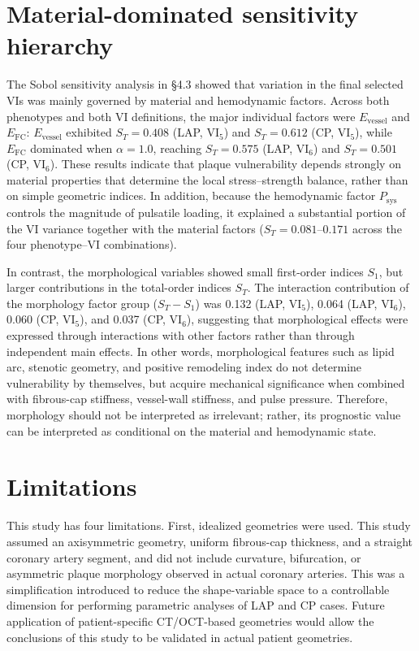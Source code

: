 \documentclass[master,english,final]{kaist-ucs}
\begin{document}
\section{Material-dominated sensitivity hierarchy}
The Sobol sensitivity analysis in \S4.3 showed that variation in the final selected VIs was mainly governed by material and hemodynamic factors. Across both phenotypes and both VI definitions, the major individual factors were $E_\mathrm{vessel}$ and $E_\mathrm{FC}$: $E_\mathrm{vessel}$ exhibited $S_T = 0.408$ (LAP, $\mathrm{VI}_5$) and $S_T = 0.612$ (CP, $\mathrm{VI}_5$), while $E_\mathrm{FC}$ dominated when $\alpha = 1.0$, reaching $S_T = 0.575$ (LAP, $\mathrm{VI}_6$) and $S_T = 0.501$ (CP, $\mathrm{VI}_6$). These results indicate that plaque vulnerability depends strongly on material properties that determine the local stress--strength balance, rather than on simple geometric indices. In addition, because the hemodynamic factor $P_\mathrm{sys}$ controls the magnitude of pulsatile loading, it explained a substantial portion of the VI variance together with the material factors ($S_T = 0.081$--$0.171$ across the four phenotype--VI combinations).

In contrast, the morphological variables showed small first-order indices $S_1$, but larger contributions in the total-order indices $S_T$. The interaction contribution of the morphology factor group ($S_T - S_1$) was 0.132 (LAP, $\mathrm{VI}_5$), 0.064 (LAP, $\mathrm{VI}_6$), 0.060 (CP, $\mathrm{VI}_5$), and 0.037 (CP, $\mathrm{VI}_6$), suggesting that morphological effects were expressed through interactions with other factors rather than through independent main effects. In other words, morphological features such as lipid arc, stenotic geometry, and positive remodeling index do not determine vulnerability by themselves, but acquire mechanical significance when combined with fibrous-cap stiffness, vessel-wall stiffness, and pulse pressure. Therefore, morphology should not be interpreted as irrelevant; rather, its prognostic value can be interpreted as conditional on the material and hemodynamic state.

\section{Limitations}
This study has four limitations. First, idealized geometries were used. This study assumed an axisymmetric geometry, uniform fibrous-cap thickness, and a straight coronary artery segment, and did not include curvature, bifurcation, or asymmetric plaque morphology observed in actual coronary arteries. This was a simplification introduced to reduce the shape-variable space to a controllable dimension for performing parametric analyses of LAP and CP cases. Future application of patient-specific CT/OCT-based geometries would allow the conclusions of this study to be validated in actual patient geometries.
\end{document}
